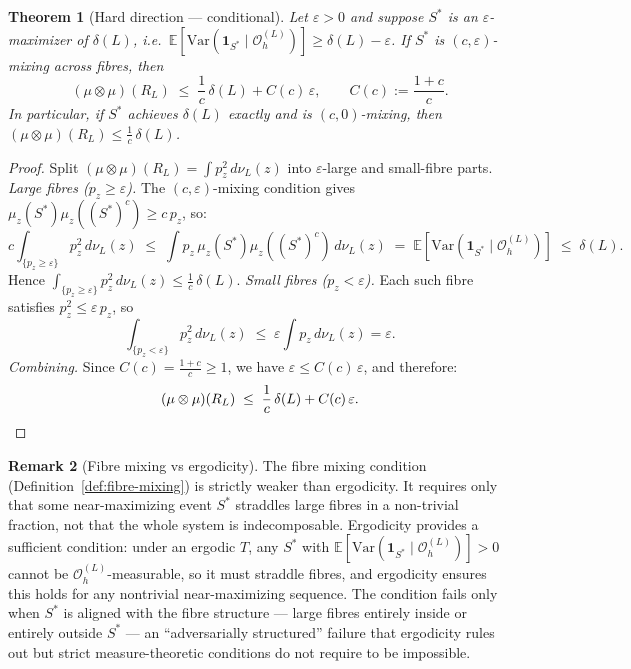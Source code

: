 \documentclass[11pt]{article}
\newtheorem{theorem}{Theorem}[section]
\theoremstyle{definition}
\newtheorem{remark}[theorem]{Remark}
\newcommand{\OL}{\mathcal{O}_h^{(L)}}
\newcommand{\RL}{R_L}
\newcommand{\dL}{\delta(L)}
\begin{document}
\begin{theorem}[Hard direction --- conditional]
\label{thm:hard}
Let $\varepsilon > 0$ and suppose $S^*$ is an $\varepsilon$-maximizer of $\dL$,
i.e.\ $\mathbb{E}[\mathrm{Var}(\mathbf{1}_{S^*}\mid\OL)] \geq \dL - \varepsilon$.
If $S^*$ is $(c,\varepsilon)$-mixing across fibres, then
\[
  (\mu \otimes \mu)(\RL) \;\leq\; \frac{1}{c}\,\dL + C(c)\,\varepsilon,
  \qquad C(c) := \frac{1+c}{c}.
\]
In particular, if $S^*$ achieves $\dL$ exactly and is $(c,0)$-mixing, then
$(\mu \otimes \mu)(\RL) \leq \frac{1}{c}\,\dL$.
\end{theorem}

\begin{proof}
Split $(\mu\otimes\mu)(\RL) = \int p_z^2\,d\nu_L(z)$ into $\varepsilon$-large and
small-fibre parts.
\emph{Large fibres ($p_z \geq \varepsilon$).}
The $(c,\varepsilon)$-mixing condition gives $\mu_z(S^*)\mu_z((S^*)^c) \geq c\,p_z$, so:
\[
  c\int_{\{p_z \geq \varepsilon\}} p_z^2\,d\nu_L(z)
  \;\leq\; \int p_z\,\mu_z(S^*)\mu_z((S^*)^c)\,d\nu_L(z)
  \;=\; \mathbb{E}[\mathrm{Var}(\mathbf{1}_{S^*}\mid\OL)]
  \;\leq\; \dL.
\]
Hence $\int_{\{p_z \geq \varepsilon\}} p_z^2\,d\nu_L(z) \leq \frac{1}{c}\,\dL$.
\emph{Small fibres ($p_z < \varepsilon$).}
Each such fibre satisfies $p_z^2 \leq \varepsilon\, p_z$, so
\[
  \int_{\{p_z < \varepsilon\}} p_z^2\,d\nu_L(z)
  \;\leq\; \varepsilon \int p_z\,d\nu_L(z) = \varepsilon.
\]
\emph{Combining.}
Since $C(c) = \frac{1+c}{c} \geq 1$, we have $\varepsilon \leq C(c)\,\varepsilon$, and therefore:
\[
  (\mu\otimes\mu)(\RL) \;\leq\; \frac{1}{c}\,\dL + C(c)\,\varepsilon. \qedhere
\]
\end{proof}

\begin{remark}[Fibre mixing vs ergodicity]
\label{rem:ergodicity}
The fibre mixing condition (Definition~\ref{def:fibre-mixing}) is strictly
weaker than ergodicity.
It requires only that some near-maximizing event $S^*$ straddles large fibres
in a non-trivial fraction, not that the whole system is indecomposable.
Ergodicity provides a sufficient condition: under an ergodic $T$, any
$S^*$ with $\mathbb{E}[\mathrm{Var}(\mathbf{1}_{S^*}\mid\OL)] > 0$ cannot be
$\OL$-measurable, so it must straddle fibres, and ergodicity ensures this holds
for any nontrivial near-maximizing sequence.
The condition fails only when $S^*$ is aligned with the fibre structure ---
large fibres entirely inside or entirely outside $S^*$ --- an
``adversarially structured'' failure that ergodicity rules out but strict
measure-theoretic conditions do not require to be impossible.
\end{remark}
\end{document}
